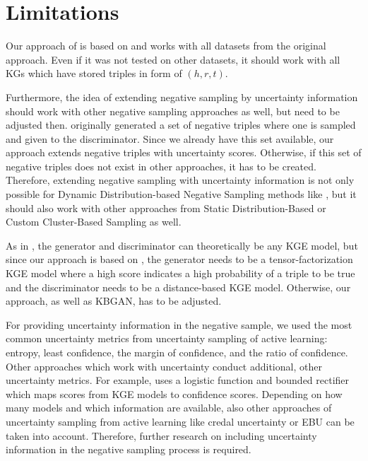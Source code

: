 \section{Limitations}  
\label{sec:limitations}
%
Our approach of \usgan is based on \kbgan and works with all datasets from the original approach.
Even if it was not tested on other datasets, it should work with all \acp{KG} which have stored triples in form of $(h,r,t)$.

Furthermore, the idea of extending negative sampling by uncertainty information should work with other negative sampling approaches as well, but need to be adjusted then.
\kbgan originally generated a set of negative triples where one is sampled and given to the discriminator.
Since we already have this set available, our approach extends negative triples with uncertainty scores.
Otherwise, if this set of negative triples does not exist in other approaches, it has to be created.
Therefore, extending negative sampling with uncertainty information is not only possible for Dynamic Distribution-based Negative Sampling methods like \kbgan, but it should also work with other approaches from Static Distribution-Based or Custom Cluster-Based Sampling as well.

As in \kbgan, the generator and discriminator can theoretically be any \ac{KGE} model, but since our approach is based on \kbgan, the generator needs to be a tensor-factorization \ac{KGE} model where a high score indicates a high probability of a triple to be true and the discriminator needs to be a distance-based \ac{KGE} model.
Otherwise, our approach, as well as \textsc{KBGAN}, has to be adjusted.

For providing uncertainty information in the negative sample, we used the most common uncertainty metrics from uncertainty sampling of active learning:
entropy, least confidence, the margin of confidence, and the ratio of confidence.
Other approaches which work with uncertainty conduct additional, other uncertainty metrics.
For example, \cite{UKGE} uses a logistic function and bounded rectifier which maps scores from \ac{KGE} models to confidence scores.
Depending on how many models and which information are available, also other approaches of uncertainty sampling from active learning like credal uncertainty or \ac{EBU} can be taken into account.
Therefore, further research on including uncertainty information in the negative sampling process is required.

